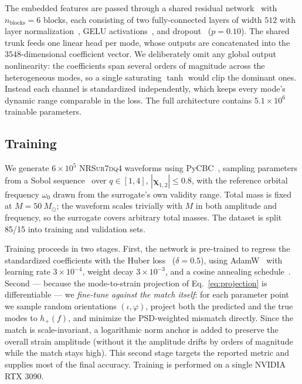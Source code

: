 \documentclass[aps,prd,twocolumn,superscriptaddress,longbibliography]{revtex4-2}
\newcommand{\NRSur}{\textsc{NRSur7dq4}}
\begin{document}
The embedded features are passed through a shared residual
network~\cite{He:2016} with $n_\mathrm{blocks}=6$ blocks, each
consisting of two fully-connected layers of width $512$ with layer
normalization~\cite{Ba:2016}, GELU activations~\cite{Hendrycks:2016},
and dropout~\cite{Srivastava:2014} ($p=0.10$).
The shared trunk feeds one linear head per mode, whose outputs are
concatenated into the $3548$-dimensional coefficient vector. We deliberately
omit any global output nonlinearity: the coefficients span several orders of
magnitude across the heterogeneous modes, so a single saturating $\tanh$ would
clip the dominant ones. Instead each channel is standardized independently,
which keeps every mode's dynamic range comparable in the loss.
The full architecture contains $5.1\times10^6$ trainable parameters.

\subsection{Training}
\label{sec:training}

We generate $6\times10^5$ \NRSur{} waveforms using
PyCBC~\cite{Usman:2016}, sampling parameters from a Sobol
sequence~\cite{Sobol:1967} over
$q\in[1,4]$, $|\boldsymbol{\chi}_{1,2}|\leq 0.8$,
with the reference orbital frequency $\omega_0$
drawn from the surrogate's own validity range.
Total mass is fixed at $M=\SI{50}{M_\odot}$; the waveform
scales trivially with $M$ in both amplitude and frequency,
so the surrogate covers arbitrary total masses.
The dataset is split 85/15 into training and validation sets.

Training proceeds in two stages. First, the network is pre-trained to
regress the standardized coefficients with the Huber
loss~\cite{Huber:1964} ($\delta=0.5$), using
AdamW~\cite{Kingma:2014,Loshchilov:2017} with learning rate
$3\times10^{-4}$, weight decay $3\times10^{-3}$, and a cosine annealing
schedule~\cite{Loshchilov:2016}. Second --- because the mode-to-strain
projection of Eq.~\eqref{eq:projection} is differentiable --- we
\emph{fine-tune against the match itself}: for each parameter point we sample
random orientations $(\iota,\varphi)$, project both the predicted and the true
modes to $h_+(f)$, and minimize the PSD-weighted mismatch directly. Since the
match is scale-invariant, a logarithmic norm anchor is added to preserve the
overall strain amplitude (without it the amplitude drifts by orders of
magnitude while the match stays high). This second stage targets the reported
metric and supplies most of the final accuracy. Training is performed on a
single NVIDIA RTX 3090.
\end{document}
